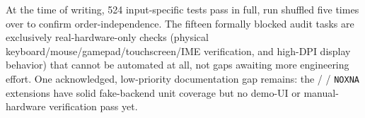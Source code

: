 At the time of writing, 524 input-specific tests pass in full, run shuffled five times over
to confirm order-independence. The fifteen formally blocked audit tasks are exclusively
real-hardware-only checks (physical keyboard/mouse/gamepad/touchscreen/IME verification, and
high-DPI display behavior) that cannot be automated at all, not gaps awaiting more
engineering effort. One acknowledged, low-priority documentation gap remains: the
 /  /  \texttt{NOXNA} extensions have solid
fake-backend unit coverage but no demo-UI or manual-hardware verification pass yet.
